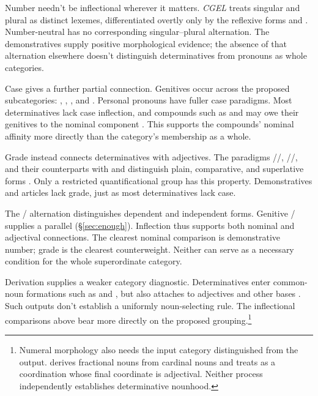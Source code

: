 \documentclass[12pt]{article}
\begin{document}
Number needn't be inflectional wherever it matters. \textit{CGEL} treats singular and plural  as distinct lexemes, differentiated overtly only by the reflexive forms  and  \citep[486]{huddleston2002}. Number-neutral  has no corresponding singular--plural alternation. The demonstratives supply positive morphological evidence; the absence of that alternation elsewhere doesn't distinguish determinatives from pronouns as whole categories.

Case gives a further partial connection. Genitives occur across the proposed subcategories: , , , and . Personal pronouns have fuller case paradigms. Most determinatives lack case inflection, and compounds such as  and  may owe their genitives to the nominal component \citep[423--424, 479--480]{huddleston2002}. This supports the compounds' nominal affinity more directly than the category's membership as a whole.

Grade instead connects determinatives with adjectives. The paradigms /\allowbreak{}/\allowbreak{}, /\allowbreak{}/\allowbreak{}, and their counterparts with  and  distinguish plain, comparative, and superlative forms \citep[391--395]{huddleston2002}. Only a restricted quantificational group has this property. Demonstratives and articles lack grade, just as most determinatives lack case.

The /\allowbreak{} alternation distinguishes dependent and independent forms. Genitive /\allowbreak{} supplies a parallel (§\ref{sec:enough}). Inflection thus supports both nominal and adjectival connections. The clearest nominal comparison is demonstrative number; grade is the clearest counterweight. Neither can serve as a necessary condition for the whole superordinate category.

Derivation supplies a weaker category diagnostic. Determinatives enter common-noun formations such as  and , but  also attaches to adjectives and other bases \citep[Ch.~19, §5.7.2(i)]{huddleston2002}. Such outputs don't establish a uniformly noun-selecting rule. The inflectional comparisons above bear more directly on the proposed grouping.\footnote{Numeral morphology also needs the input category distinguished from the output. \textcite[§§5.4--5.5]{reynolds2026numerals} derives fractional nouns from cardinal nouns and treats  as a coordination whose final coordinate is adjectival. Neither process independently establishes determinative nounhood.}
\end{document}
